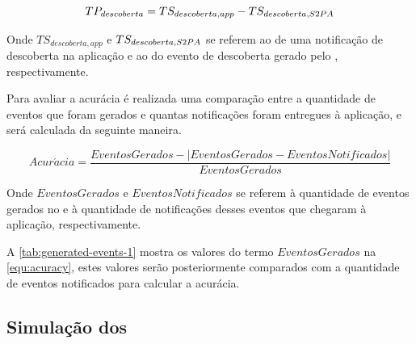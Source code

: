 \begin{equation}
	\label{equ:performance-discovery}
	TP_{descoberta} = TS_{descoberta,app} - TS_{descoberta,S2PA}
\end{equation}

Onde $TS_{descoberta,app}$ e $TS_{descoberta,S2PA}$ se referem ao \timestamp de uma notificação de descoberta na aplicação e ao \timestamp do evento de descoberta gerado pelo \stwopa, respectivamente.

Para avaliar a acurácia é realizada uma comparação entre a quantidade de eventos que foram gerados e quantas notificações foram entregues à aplicação, e será calculada da seguinte maneira.

\begin{equation}
	\label{equ:acuracy}
	Acur\acute{a}cia = \frac{EventosGerados - |EventosGerados - EventosNotificados|}{EventosGerados}
\end{equation}

Onde $EventosGerados$ e $EventosNotificados$ se referem à quantidade de eventos gerados no \stwopa e à quantidade de notificações desses eventos que chegaram à aplicação, respectivamente.

A \autoref{tab:generated-events-1} mostra os valores do termo $EventosGerados$ na \autoref{equ:acuracy}, estes valores serão posteriormente comparados com a quantidade de eventos notificados para calcular a acurácia.

\begin{table}[htb]
	\begin{center}
	\end{center}
\end{table}

\subsection{Simulação dos \beacons}\label{chap:avaliacao-simulacao-beacons}

